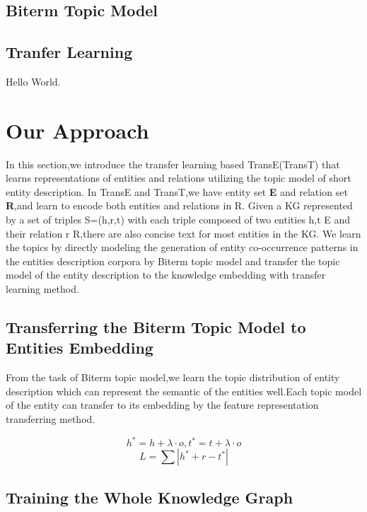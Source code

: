\documentclass[11pt]{article}
\begin{document}
\subsection{Biterm Topic Model}



\subsection{Tranfer Learning}

Hello World.

\section{Our Approach}

In this section,we introduce the transfer learning based TransE(TransT) that learns representations of entities and relations utilizing the topic model of short entity description.
In TransE and TransT,we have entity set \textbf{E} and relation set \textbf{R},and learn to encode both entities and relations in  R.
Given a KG represented by a set of triples S={(h,r,t)} with each triple composed of two entities h,t E and
their relation r R,there are also concise text for most entities in the KG.
We learn the topics by directly modeling the generation of entity co-occurrence patterns in the entities description corpora by Biterm topic model and transfer the topic model of the entity description to the knowledge embedding with transfer learning method.


\subsection{Transferring the Biterm Topic Model to Entities Embedding}
\label{sect:pdf}

From the task of Biterm topic model,we learn the topic distribution of entity description which can represent the semantic of the entities well.Each topic model of the entity can transfer to its embedding by the feature representation transferring method.

\begin{equation} 
h^*=h + \lambda\cdot o,
t^*=t + \lambda\cdot o
\end{equation}
\begin{equation}
L=\sum|h^*+r-t^*|
\end{equation}

\subsection{Training the Whole Knowledge Graph}
\label{ssec:layout}
\end{document}
